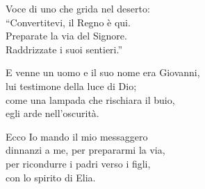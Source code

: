 
\strofa Voce di uno che grida nel deserto:\\
``Convertitevi, il Regno è qui.\\
Preparate la via del Signore.\\
Raddrizzate i suoi sentieri.''

\spazio


\spazio

\strofa E venne un uomo e il suo nome era Giovanni,\\
lui testimone della luce di Dio;\\
come una lampada che rischiara il buio,\\
egli arde nell'oscurità.

\spazio


\spazio

\strofa Ecco Io mando il mio messaggero\\
dinnanzi a me, per prepararmi la via,\\
per ricondurre i padri verso i figli,\\
con lo spirito di Elia.

\spazio

